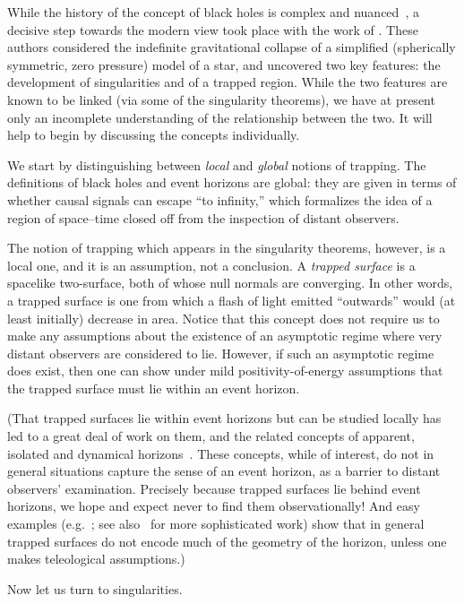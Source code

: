 \documentclass[
%
draft    %
,numberedheadings 
,bibliocites
  ]
  {aipproc}
\begin{document}
While the history of the concept of black holes is complex and nuanced~\citep{Israel:1987ae}, a decisive step towards the modern view took place with the work of \citet{Oppenheimer:1939ue}.  These authors considered the indefinite gravitational collapse of a simplified (spherically symmetric, zero pressure) model of a star, and uncovered two key features:  the development of singularities and of a trapped region.
While the two features are known to be linked (via some of the singularity theorems),
we have at present only an incomplete 
understanding of the relationship between the two.  
It will help to begin by discussing the concepts individually.

We start by distinguishing between {\em local} and {\em global} notions of trapping.  The definitions of black holes and event horizons are global:  they are given in terms of whether causal signals can escape ``to infinity,'' which formalizes the idea of a region of space--time closed off from the inspection of distant observers. 

The notion of trapping which appears in the singularity theorems, however, is a local one, and it is an assumption, not a conclusion.  A {\em trapped surface}  is  a spacelike two-surface, both of whose null normals are converging.  In other words, a trapped surface is one from which a flash of light emitted ``outwards'' would (at least initially) decrease in area.
Notice that this concept does not require us to make any assumptions about the existence of an asymptotic regime where very distant observers are considered to lie.  However, if such an asymptotic regime does exist, then one can show under mild positivity-of-energy assumptions that the trapped surface must lie within an event horizon.

(That trapped surfaces lie within event horizons but can be studied locally has led to a great deal of work on them, and the related concepts of apparent, isolated and dynamical horizons~\citep{Hawking:1973uf,Ashtekar:2004cn}.
These concepts, while of interest, do not in general situations capture the sense of an event horizon, as a barrier to distant observers' examination.
Precisely because trapped surfaces lie behind event horizons, we hope and expect never to find them observationally!  And easy examples (e.g.~\citep{Booth:2005qc}; see also~\citep{Williams:2008} for more sophisticated work) show that in general trapped surfaces do not encode much of the geometry of the horizon, unless one makes teleological assumptions.)


Now let us turn to singularities.
\end{document}
